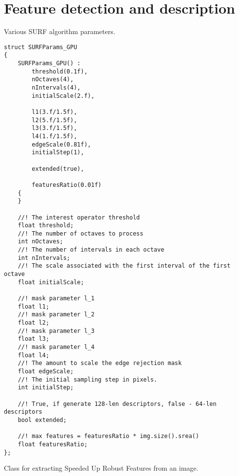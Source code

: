\begin{description}
\end{description}

\section{Feature detection and description}

Various SURF algorithm parameters. 

\begin{lstlisting}
struct SURFParams_GPU 
{
    SURFParams_GPU() :
        threshold(0.1f), 
        nOctaves(4),
        nIntervals(4),
        initialScale(2.f),

        l1(3.f/1.5f),
        l2(5.f/1.5f),
        l3(3.f/1.5f),
        l4(1.f/1.5f),
        edgeScale(0.81f),
        initialStep(1),

        extended(true),

        featuresRatio(0.01f)
    {
    }

    //! The interest operator threshold
    float threshold;
    //! The number of octaves to process
    int nOctaves;
    //! The number of intervals in each octave
    int nIntervals;
    //! The scale associated with the first interval of the first octave
    float initialScale;

    //! mask parameter l_1
    float l1;
    //! mask parameter l_2 
    float l2;
    //! mask parameter l_3
    float l3;
    //! mask parameter l_4
    float l4;
    //! The amount to scale the edge rejection mask
    float edgeScale;
    //! The initial sampling step in pixels.
    int initialStep;

    //! True, if generate 128-len descriptors, false - 64-len descriptors
    bool extended;

    //! max features = featuresRatio * img.size().srea()
    float featuresRatio;
};
\end{lstlisting}

Class for extracting Speeded Up Robust Features from an image.

